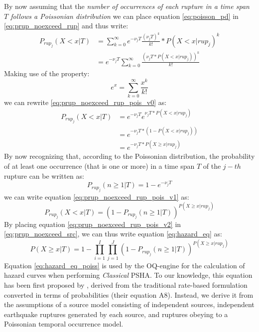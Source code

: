 By now assuming that the \textit{number of occurrences of each rupture in a time span $T$ follows a Poissonian distribution}
we can place equation \ref{eq:poisson_pd} in \ref{eq:prup_noexceed_rup} and thus write:
\begin{align}
\label{eq:prup_noexceed_rup_pois_v0}
P_{rup_{j}}(X < x | T) & = \sum_{k=0}^{\infty} e^{-\nu_{j} T} \frac{(\nu_{j} T) ^ {k}}{k!} * P(X < x | rup_{j}) ^ {k} \nonumber \\
				 & =  e^{-\nu_{j} T} \sum_{k=0}^{\infty} \frac{(\nu_{j} T * P(X < x | rup_{j})) ^ {k}}{k!}
\end{align}
Making use of the property:
\begin{equation}
e^{x} = \sum_{k=0} ^ {\infty} \frac{x^{k}}{k!}
\end{equation}
we can rewrite \ref{eq:prup_noexceed_rup_pois_v0} as:
\begin{align}
\label{eq:prup_noexceed_rup_pois_v1}
P_{rup_{j}}(X < x | T) & = e^{-\nu_{j} T} e ^ {\nu_{j} T * P(X < x | rup_{j})} \nonumber \\
				 & = e^{-\nu_{j} T * (1 - P(X < x | rup_{j}))} \nonumber \\
				 & = e^{-\nu_{j} T * P(X \ge x | rup_{j})}
\end{align}
By now recognizing that, according to the Poissonian distribution, the probability of at least one occurrence
(that is one or more) in a time span $T$ of the $j-th$ rupture can be written as:
\begin{equation}
P_{rup_{j}}(n \ge 1 | T) = 1 -  e^{-\nu_{j} T}
\end{equation}
we can write equation \ref{eq:prup_noexceed_rup_pois_v1} as:
\begin{equation}
\label{eq:prup_noexceed_rup_pois_v2}
P_{rup_{j}}(X < x | T) = (1 - P_{rup_{j}}(n \ge 1 | T))^{P(X \ge x | rup_{j})}
\end{equation}
By placing equation \ref{eq:prup_noexceed_rup_pois_v2} in \ref{eq:prup_noexceed_src}, we can thus
write equation \ref{eq:hazard_eq} as:
\begin{equation}
\label{eq:hazard_eq_poiss}
P(X \ge x | T) =  1 - \prod_{i=1}^{I} \prod_{j=1}^{J} (1 - P_{rup_{j}}(n \ge 1 | T))^{P(X \ge x | rup_{j})}
\end{equation}
Equation \ref{eq:hazard_eq_poiss} is used by the OQ-engine for the calculation of hazard curves when performing
\textit{Classical} PSHA. To our knowledge, this equation has been first proposed by \cite{field2003},
derived from the traditional rate-based formulation converted in terms of probabilities (their equation A8).
Instead, we derive it from the assumptions of a source model consisting of independent sources, independent
earthquake ruptures generated by each source, and ruptures obeying to a Poissonian temporal occurrence model.

